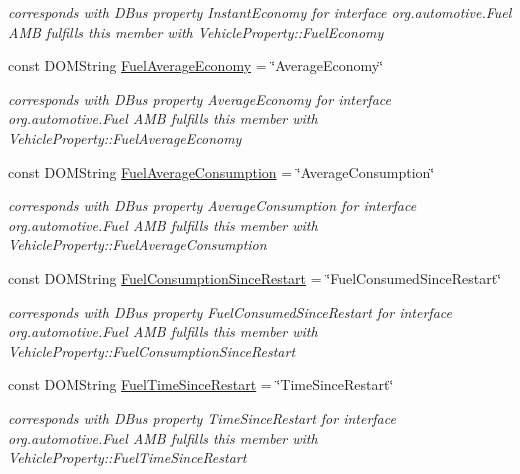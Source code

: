 \begin{DoxyCompactItemize}
\begin{DoxyCompactList}\small\item\em corresponds with D\+Bus property Instant\+Economy for interface org.\+automotive.\+Fuel A\+M\+B fulfills this member with Vehicle\+Property\+::\+Fuel\+Economy \end{DoxyCompactList}\item 
\hypertarget{interfaceFuel_a10a854ac1c73a8796a510c69da92f7b6}{const D\+O\+M\+String \hyperlink{interfaceFuel_a10a854ac1c73a8796a510c69da92f7b6}{Fuel\+Average\+Economy} = \char`\"{}Average\+Economy\char`\"{}}\label{interfaceFuel_a10a854ac1c73a8796a510c69da92f7b6}

\begin{DoxyCompactList}\small\item\em corresponds with D\+Bus property Average\+Economy for interface org.\+automotive.\+Fuel A\+M\+B fulfills this member with Vehicle\+Property\+::\+Fuel\+Average\+Economy \end{DoxyCompactList}\item 
\hypertarget{interfaceFuel_a38dcf97480a2db27c909dbd669cf985f}{const D\+O\+M\+String \hyperlink{interfaceFuel_a38dcf97480a2db27c909dbd669cf985f}{Fuel\+Average\+Consumption} = \char`\"{}Average\+Consumption\char`\"{}}\label{interfaceFuel_a38dcf97480a2db27c909dbd669cf985f}

\begin{DoxyCompactList}\small\item\em corresponds with D\+Bus property Average\+Consumption for interface org.\+automotive.\+Fuel A\+M\+B fulfills this member with Vehicle\+Property\+::\+Fuel\+Average\+Consumption \end{DoxyCompactList}\item 
\hypertarget{interfaceFuel_a6d1e861e2d57b75407f37591f907b213}{const D\+O\+M\+String \hyperlink{interfaceFuel_a6d1e861e2d57b75407f37591f907b213}{Fuel\+Consumption\+Since\+Restart} = \char`\"{}Fuel\+Consumed\+Since\+Restart\char`\"{}}\label{interfaceFuel_a6d1e861e2d57b75407f37591f907b213}

\begin{DoxyCompactList}\small\item\em corresponds with D\+Bus property Fuel\+Consumed\+Since\+Restart for interface org.\+automotive.\+Fuel A\+M\+B fulfills this member with Vehicle\+Property\+::\+Fuel\+Consumption\+Since\+Restart \end{DoxyCompactList}\item 
\hypertarget{interfaceFuel_ab67ddc1003565005be77b218cd5218af}{const D\+O\+M\+String \hyperlink{interfaceFuel_ab67ddc1003565005be77b218cd5218af}{Fuel\+Time\+Since\+Restart} = \char`\"{}Time\+Since\+Restart\char`\"{}}\label{interfaceFuel_ab67ddc1003565005be77b218cd5218af}

\begin{DoxyCompactList}\small\item\em corresponds with D\+Bus property Time\+Since\+Restart for interface org.\+automotive.\+Fuel A\+M\+B fulfills this member with Vehicle\+Property\+::\+Fuel\+Time\+Since\+Restart \end{DoxyCompactList}\end{DoxyCompactItemize}


